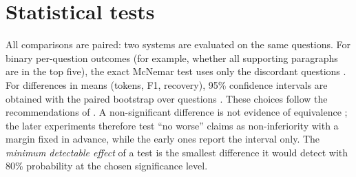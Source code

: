 \section{Statistical tests}
\label{sec:bg_tests}

All comparisons are paired: two systems are evaluated on the same questions. For binary per-question outcomes (for example, whether all supporting paragraphs are in the top five), the exact McNemar test uses only the discordant questions \cite{mcnemar1947}. For differences in means (tokens, F1, recovery), 95\% confidence intervals are obtained with the paired bootstrap over questions \cite{efron1979bootstrap}. These choices follow the recommendations of . A non-significant difference is not evidence of equivalence \cite{card2020power}; the later experiments therefore test ``no worse'' claims as non-inferiority with a margin fixed in advance, while the early ones report the interval only. The \emph{minimum detectable effect} of a test is the smallest difference it would detect with 80\% probability at the chosen significance level.
